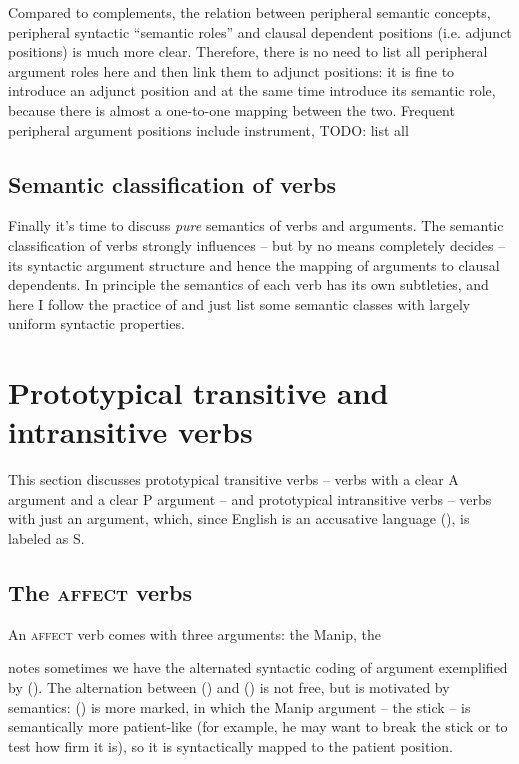 \documentclass[UTF8, a4paper, oneside, scheme=plain]{ctexrep}
\newcommand*{\citesec}[1]{\S~{#1}}
\newcommand{\category}[1]{\textsc{#1}}
\begin{document}
Compared to complements, the relation between peripheral semantic concepts,
peripheral syntactic ``semantic roles'' 
and clausal dependent positions (i.e. adjunct positions)
is much more clear. 
Therefore, there is no need to list all peripheral argument roles here 
and then link them to adjunct positions: 
it is fine to introduce an adjunct position and at the same time introduce its semantic role,
because there is almost a one-to-one mapping between the two.
Frequent peripheral argument positions include instrument, TODO: list all

\subsection{Semantic classification of verbs}

Finally it's time to discuss \emph{pure} semantics of verbs and arguments.
The semantic classification of verbs strongly influences -- but by no means completely decides --
its syntactic argument structure 
and hence the mapping of arguments to clausal dependents.
In principle the semantics of each verb has its own subtleties,
and here I follow the practice of \citet{dixon2005semantic}
and just list some semantic classes with largely uniform syntactic properties.

\section{Prototypical transitive and intransitive verbs}

This section discusses prototypical transitive verbs -- verbs with a clear A argument and a clear P argument --
and prototypical intransitive verbs -- verbs with just an argument,
which, since English is an accusative language (),
is labeled as S.

\subsection{The \category{affect} verbs}

An \category{affect} verb comes with three arguments:
the Manip, the 

\citet[\citesec{4.2}]{dixon2005semantic} notes 
sometimes we have the alternated syntactic coding of argument 
exemplified by ().
The alternation between () and () is not free,
but is motivated by semantics:
() is more marked,
in which the Manip argument -- the stick -- is semantically more patient-like
(for example, he may want to break the stick or to test how firm it is),
so it is syntactically mapped to the patient position. 
\end{document}
